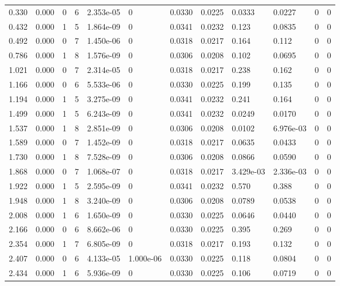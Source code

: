 \documentclass[preview]{standalone}
\begin{document}
{{\begin{tabular}{L{1.2cm}C{1.2cm} C{0.3cm}C{0.5cm} C{1.4cm}C{1.4cm} C{1.4cm}C{1.4cm} C{1.6cm}C{1.6cm} C{1.6cm}C{1.6cm}}
  0.330  &  0.000  & 0     &  6 &  2.353e-05  & 0  &  0.0330&   0.0225& 0.0333 & 0.0227   &  0 & 0  \\ 
  0.432  &  0.000  & 1     &  5 &  1.864e-09  & 0  &  0.0341&   0.0232& 0.123 & 0.0835   &  0 & 0  \\ 
  0.492  &  0.000  & 0     &  7 &  1.450e-06  & 0  &  0.0318&   0.0217& 0.164 & 0.112   &  0 & 0  \\ 
  0.786  &  0.000  & 1     &  8 &  1.576e-09  & 0  &  0.0306&   0.0208& 0.102 & 0.0695   &  0 & 0  \\ 
  1.021  &  0.000  & 0     &  7 &  2.314e-05  & 0  &  0.0318&   0.0217& 0.238 & 0.162   &  0 & 0  \\ 
  1.166  &  0.000  & 0     &  6 &  5.533e-06  & 0  &  0.0330&   0.0225& 0.199 & 0.135   &  0 & 0  \\ 
  1.194  &  0.000  & 1     &  5 &  3.275e-09  & 0  &  0.0341&   0.0232& 0.241 & 0.164   &  0 & 0  \\ 
  1.499  &  0.000  & 1     &  5 &  6.243e-09  & 0  &  0.0341&   0.0232& 0.0249 & 0.0170   &  0 & 0  \\ 
  1.537  &  0.000  & 1     &  8 &  2.851e-09  & 0  &  0.0306&   0.0208& 0.0102 & 6.976e-03   &  0 & 0  \\ 
  1.589  &  0.000  & 0     &  7 &  1.452e-09  & 0  &  0.0318&   0.0217& 0.0635 & 0.0433   &  0 & 0  \\ 
  1.730  &  0.000  & 1     &  8 &  7.528e-09  & 0  &  0.0306&   0.0208& 0.0866 & 0.0590   &  0 & 0  \\ 
  1.868  &  0.000  & 0     &  7 &  1.068e-07  & 0  &  0.0318&   0.0217& 3.429e-03 & 2.336e-03   &  0 & 0  \\ 
  1.922  &  0.000  & 1     &  5 &  2.595e-09  & 0  &  0.0341&   0.0232& 0.570 & 0.388   &  0 & 0  \\ 
  1.948  &  0.000  & 1     &  8 &  3.240e-09  & 0  &  0.0306&   0.0208& 0.0789 & 0.0538   &  0 & 0  \\ 
  2.008  &  0.000  & 1     &  6 &  1.650e-09  & 0  &  0.0330&   0.0225& 0.0646 & 0.0440   &  0 & 0  \\ 
  2.166  &  0.000  & 0     &  6 &  8.662e-06  & 0  &  0.0330&   0.0225& 0.395 & 0.269   &  0 & 0  \\ 
  2.354  &  0.000  & 1     &  7 &  6.805e-09  & 0  &  0.0318&   0.0217& 0.193 & 0.132   &  0 & 0  \\ 
  2.407  &  0.000  & 0     &  6 &  4.133e-05  & 1.000e-06  &  0.0330&   0.0225& 0.118 & 0.0804   &  0 & 0  \\ 
  2.434  &  0.000  & 1     &  6 &  5.936e-09  & 0  &  0.0330&   0.0225& 0.106 & 0.0719   &  0 & 0  \\ 

\end{tabular}}}
\end{document}
